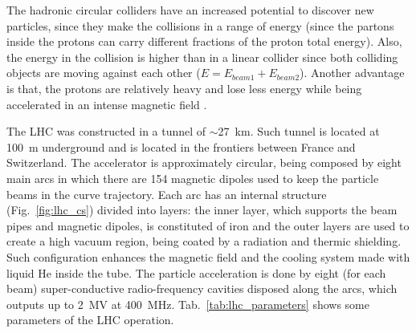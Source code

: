 The hadronic circular colliders have an increased potential to discover new particles, since they make the collisions in a range of energy (since the partons inside the protons can carry different fractions of the proton total energy). Also, the energy in the collision is higher than in a linear collider since both colliding objects are moving against each other ($E = E_{beam1} + E_{beam2}$). Another advantage is that, the protons are relatively heavy and lose less energy while being accelerated in an intense magnetic field \cite{bib:Nature-448-2017}.

The LHC was constructed in a tunnel of $\sim$27~km. Such tunnel is located at 100~m underground and is located in the frontiers between France and Switzerland. The accelerator is approximately circular, being composed by eight main arcs in which there are 154 magnetic dipoles used to keep the particle beams in the curve trajectory. Each arc has an internal structure (Fig.~\ref{fig:lhc_cs}) divided into layers: the inner layer, which supports the beam pipes and magnetic dipoles, is constituted of iron and the outer layers are used to create a high vacuum region, being coated by a radiation and thermic shielding. Such configuration enhances the magnetic field and the cooling system made with liquid He inside the tube. The particle acceleration is done by eight (for each beam) super-conductive radio-frequency cavities disposed along the arcs, which outputs up to 2~MV at 400~MHz. Tab.~\ref{tab:lhc_parameters} shows some parameters of the LHC operation.

